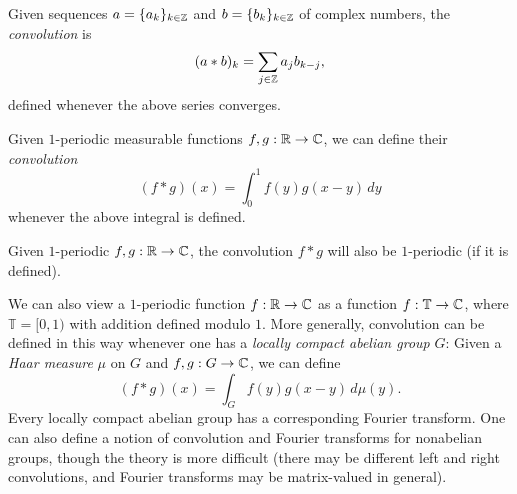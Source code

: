 \begin{definition}
  Given sequences $a = \{a_k\}_{k \in \mathbb{Z}}$
  and $b = \{b_k\}_{k \in \mathbb{Z}}$ of complex numbers,
  the \emph{convolution} is
  \[
    (a * b)_k = \sum_{j \in \mathbb{Z}} a_j b_{k - j},
  \]
  defined whenever the above series converges.
\end{definition}

\pagebreak

\begin{definition}
  Given $1$-periodic measurable functions
  $f, g : \mathbb{R} \to \mathbb{C}$, we can define their
  \emph{convolution}
  \[
    (f * g)(x)
    = \int_0^1 f(y) g(x - y)\, dy
  \]
  whenever the above integral is defined.
\end{definition}

\begin{remark}
  Given $1$-periodic
  $f, g : \mathbb{R} \to \mathbb{C}$, the
  convolution $f * g$ will also be $1$-periodic
  (if it is defined).
\end{remark}

\begin{remark}
  We can also view a $1$-periodic
  function $f : \mathbb{R} \to \mathbb{C}$ as a function
  $f : \mathbb{T} \to \mathbb{C}$, where $\mathbb{T} = [0, 1)$
  with addition defined modulo $1$.
  More generally, convolution can be defined in this way
  whenever one has a \emph{locally compact abelian group}
  $G$: Given a \emph{Haar measure} $\mu$ on $G$
  and $f, g : G \to \mathbb{C}$, we can define
  \[
    (f * g)(x) = \int_G f(y) g(x - y)\, d\mu(y).
  \]
  Every locally compact abelian group has a corresponding
  Fourier transform.
  One can also define a notion of convolution
  and Fourier transforms for nonabelian groups,
  though the theory is more difficult (there
  may be different
  left and right convolutions, and Fourier transforms may be matrix-valued in general).
\end{remark}
